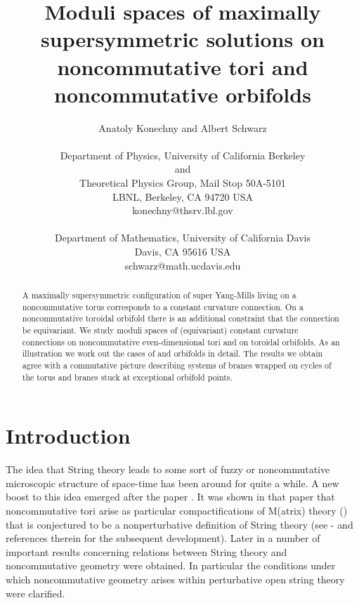 \documentclass[a4paper,a4paper]{article}
\begin{document}
\author{Anatoly Konechny\coordHE{} and  Albert Schwarz\coordHE{}\\
 \\
\coordHE{}Department of Physics, University of California Berkeley \\
and \\
Theoretical Physics Group, Mail Stop 50A-5101\\
LBNL, Berkeley, CA 94720 USA \\ 
konechny@thsrv.lbl.gov\\
\\
\coordHE{}Department of Mathematics, University of California Davis\\
Davis, CA 95616 USA\\
  schwarz@math.ucdavis.edu}


\title{\bf Moduli spaces of maximally supersymmetric  solutions on noncommutative tori and 
noncommutative orbifolds }
\maketitle
\large
\begin{abstract}
\large
A maximally supersymmetric configuration of super Yang-Mills living on a noncommutative
torus corresponds to a constant curvature connection. On a noncommutative toroidal 
orbifold there is an additional constraint that the connection be equivariant. 
We study moduli spaces of (equivariant) constant curvature connections on 
noncommutative even-dimensional tori and on toroidal orbifolds. 
As an illustration we work out the cases of \coordHE{} and \coordHE{} orbifolds 
in detail. The results we obtain 
agree with a commutative picture describing   systems of branes wrapped on cycles of the torus and 
branes stuck at exceptional orbifold points.
\end{abstract}
\large
\section{Introduction}
The idea that String theory leads to some sort of fuzzy or noncommutative 
microscopic structure of space-time has been around for quite a while. 
 A new boost to this idea emerged  after  the paper \cite{CDS}. 
It was shown in that paper that noncommutative tori arise as particular compactifications 
of M(atrix) theory (\cite{BFSS}) that is conjectured to be a nonperturbative definition of 
String theory (see \cite{DougHull} - \cite{Schomerus} and references therein for  the subsequent development). 
Later in \cite{SeibWitt} a number of important results concerning relations between String theory 
and noncommutative geometry were obtained. In particular the conditions
under which noncommutative geometry arises within perturbative open string theory were clarified.  
\end{document}
